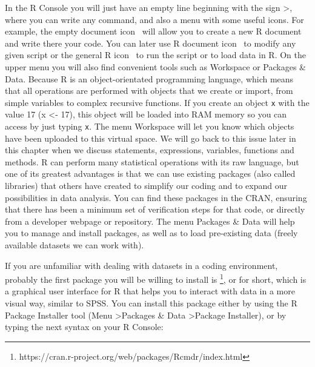 In the R Console you will just have an empty line beginning with the
sign \textgreater, where you can write any command, and also a menu
with some useful icons. For example, the empty document icon \icon
\ will allow you to create a new R document and write there your
code. You can later use R document icon \doc \ to modify any given
script or the general R icon \rcom \ to run the script or to load data
in R. On the upper menu you will also find convenient tools such as
Workspace or Packages \& Data. Because R is an
object-orientated programming language, which means that all
operations are performed with objects that we create or import, from
simple variables to complex recursive functions. If you create an
object \texttt{x} with the value 17 (x \textless- 17), this object will
be loaded into RAM memory so you can access by just typing \texttt{x}.
The menu Workspace will let you know which objects
have been uploaded to this virtual space. We will go back to this
issue later in this chapter when we discuss statements, expressions,
variables, functions and methods. R can perform many statistical operations with its
raw language, but one of its greatest advantages is that we can use
existing packages (also called libraries) that others have created to
simplify our coding and to expand our possibilities in data
analysis. You can find these packages in the CRAN, ensuring that there
has been a minimum set of verification steps for that code, or
directly from a developer webpage or repository. The menu Packages \&
Data will help you to manage and install packages, as well as to load
pre-existing data (freely available datasets we can work with).

If you are unfamiliar with dealing with datasets in a coding
environment, probably the first package you will be willing to install
is \footnote{https://cran.r-project.org/web/packages/Rcmdr/index.html},
or  for short, which is a graphical user interface for R that
helps you to interact with data in a more visual way, similar to SPSS.
You can install this package either by using the R Package Installer
tool (Menu \textgreater Packages \& Data \textgreater Package
Installer), or by typing the next syntax on your R Console:


